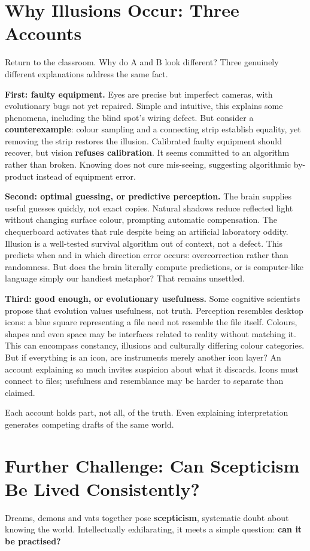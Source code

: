 \section{Why Illusions Occur: Three Accounts}
Return to the classroom. Why do A and B look different? Three genuinely different explanations address the same fact.

\textbf{First: faulty equipment.} Eyes are precise but imperfect cameras, with evolutionary bugs not yet repaired. Simple and intuitive, this explains some phenomena, including the blind spot's wiring defect. But consider a \textbf{counterexample}: colour sampling and a connecting strip establish equality, yet removing the strip restores the illusion. Calibrated faulty equipment should recover, but vision \textbf{refuses calibration}. It seems committed to an algorithm rather than broken. Knowing does not cure mis-seeing, suggesting algorithmic by-product instead of equipment error.

\textbf{Second: optimal guessing, or predictive perception.} The brain supplies useful guesses quickly, not exact copies. Natural shadows reduce reflected light without changing surface colour, prompting automatic compensation. The chequerboard activates that rule despite being an artificial laboratory oddity. Illusion is a well-tested survival algorithm out of context, not a defect. This predicts when and in which direction error occurs: overcorrection rather than randomness. But does the brain literally compute predictions, or is computer-like language simply our handiest metaphor? That remains unsettled.

\textbf{Third: good enough, or evolutionary usefulness.} Some cognitive scientists propose that evolution values usefulness, not truth. Perception resembles desktop icons: a blue square representing a file need not resemble the file itself. Colours, shapes and even space may be interfaces related to reality without matching it. This can encompass constancy, illusions and culturally differing colour categories. But if everything is an icon, are instruments merely another icon layer? An account explaining so much invites suspicion about what it discards. Icons must connect to files; usefulness and resemblance may be harder to separate than claimed.

Each account holds part, not all, of the truth. Even explaining interpretation generates competing drafts of the same world.

\section[Further Challenge: Living Scepticism]{Further Challenge: Can Scepticism Be Lived Consistently?}
Dreams, demons and vats together pose \textbf{scepticism}, systematic doubt about knowing the world. Intellectually exhilarating, it meets a simple question: \textbf{can it be practised?}


